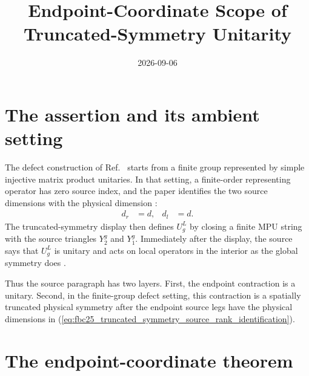 \documentclass{article}
\title{Endpoint-Coordinate Scope of Truncated-Symmetry Unitarity}
\author{}
\date{2026-09-06}
\begin{document}
\maketitle
{}

\section{The assertion and its ambient setting}

The defect construction of Ref.~\cite{FrancoRubio2025MPUGauging} starts from a
finite group represented by simple injective matrix product unitaries. In that
setting, a finite-order representing operator has zero source index, and the
paper identifies the two source dimensions with the physical dimension
\cite[line~1547]{FrancoRubio2025MPUGauging}:
\begin{align}
    d_r & = d, & d_l & = d.
    \label{eq:fbc25_truncated_symmetry_source_rank_identification}
\end{align}
The truncated-symmetry display  then defines
\(U_g^L\) by closing a finite MPU string with the source triangles \(Y_2^g\)
and \(Y_1^g\). Immediately after the display, the source says that \(U_g^L\)
is unitary and acts on local operators in the interior as the global symmetry
does \cite[lines~2062--2099]{FrancoRubio2025MPUGauging}.

Thus the source paragraph has two layers. First, the endpoint contraction is a
unitary. Second, in the finite-group defect setting, this contraction is a
spatially truncated physical symmetry after the endpoint source legs have the
physical dimensions in
(\ref{eq:fbc25_truncated_symmetry_source_rank_identification}).

\section{The endpoint-coordinate theorem}
\end{document}
